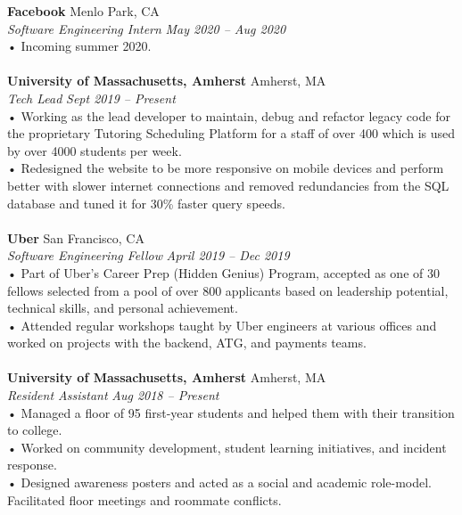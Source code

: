 \documentclass[margin,line]{resume}
\begin{document}
\begin{resume}
    \textbf{Facebook} \hfill Menlo Park, CA
    \\
    \textsl{Software Engineering Intern} \hfill \textsl{May 2020 -- Aug 2020}
    \\
    •   Incoming summer 2020.
    \\ \vspace{-1.5mm} \\
    \textbf{University of Massachusetts, Amherst} \hfill Amherst, MA
    \\
    \textsl{Tech Lead} \hfill \textsl{Sept 2019 -- Present}
    \\
    •	Working as the lead developer to maintain, debug and refactor legacy code for the proprietary Tutoring Scheduling Platform for a staff of over 400 which is used by over 4000 students per week.
    \\
    •	Redesigned the website to be more responsive on mobile devices and perform better with slower internet connections and removed redundancies from the SQL database and tuned it for 30\% faster query speeds.
    \\ \vspace{-1.5mm} \\
    \textbf{Uber} \hfill San Francisco, CA
    \\
    \textsl{Software Engineering Fellow} \hfill \textsl{April 2019 -- Dec 2019}
    \\
    •	Part of Uber’s Career Prep (Hidden Genius) Program, accepted as one of 30 fellows selected from a pool of over 800 applicants based on leadership potential, technical skills, and personal achievement.
    \\
    •	Attended regular workshops taught by Uber engineers at various offices and worked on projects with the backend, ATG, and payments teams.
    \\ \vspace{-1.5mm} \\
    \textbf{University of Massachusetts, Amherst} \hfill Amherst, MA
    \\
    \textsl{Resident Assistant} \hfill \textsl{Aug 2018 -- Present}
    \\
    •	Managed a floor of 95 first-year students and helped them with their transition to college.
    \\
    •	Worked on community development, student learning initiatives, and incident response. 
    \\
    •	Designed awareness posters and acted as a social and academic role-model. Facilitated floor meetings and roommate conflicts.

\end{resume}
\end{document}
